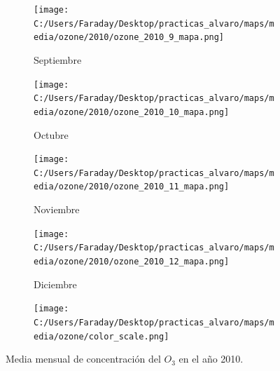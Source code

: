 \documentclass[12pt]{beamer}
\begin{document}
\begin{frame}[squeeze]
\begin{figure}[H]
\begin{subfigure}[H]{0.20\textwidth}
\texttt{[image: C:/Users/Faraday/Desktop/practicas\_alvaro/maps/media/ozone/2010/ozone\_2010\_9\_mapa.png]}
\captionsetup{labelformat=empty}
\caption{\scriptsize Septiembre}
\label{fig:map-ozone-2010-9}
\end{subfigure}
%
\begin{subfigure}[H]{0.20\textwidth}
\texttt{[image: C:/Users/Faraday/Desktop/practicas\_alvaro/maps/media/ozone/2010/ozone\_2010\_10\_mapa.png]}
\captionsetup{labelformat=empty}
\caption{\scriptsize Octubre}
\label{fig:map-ozone-2010-10}
\end{subfigure}
%
\begin{subfigure}[H]{0.20\textwidth}
\texttt{[image: C:/Users/Faraday/Desktop/practicas\_alvaro/maps/media/ozone/2010/ozone\_2010\_11\_mapa.png]}
\captionsetup{labelformat=empty}
\caption{\scriptsize Noviembre}
\label{fig:map-ozone-2010-11}
\end{subfigure}
%
\begin{subfigure}[H]{0.20\textwidth}
\texttt{[image: C:/Users/Faraday/Desktop/practicas\_alvaro/maps/media/ozone/2010/ozone\_2010\_12\_mapa.png]}
\captionsetup{labelformat=empty}
\caption{\scriptsize Diciembre}
\label{fig:map-ozone-2010-12}
\end{subfigure}

\begin{subfigure}[H]{0.45\textwidth}
\texttt{[image: C:/Users/Faraday/Desktop/practicas\_alvaro/maps/media/ozone/color\_scale.png]}
\captionsetup{labelformat=empty}
\caption{}
\end{subfigure}

\vspace*{-7mm}
\caption{\scriptsize Media mensual de concentración del $O_{3}$ en el año 2010.}
\label{fig:map-ozone-2010}
\end{figure}
\end{frame}
\end{document}
